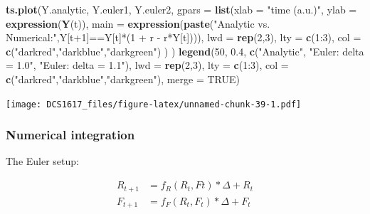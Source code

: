 \documentclass[]{book}
\newenvironment{Shaded}{\begin{snugshade}}{\end{snugshade}}
\newcommand{\KeywordTok}[1]{\textcolor[rgb]{0.13,0.29,0.53}{\textbf{{#1}}}}
\newcommand{\DataTypeTok}[1]{\textcolor[rgb]{0.13,0.29,0.53}{{#1}}}
\newcommand{\DecValTok}[1]{\textcolor[rgb]{0.00,0.00,0.81}{{#1}}}
\newcommand{\FloatTok}[1]{\textcolor[rgb]{0.00,0.00,0.81}{{#1}}}
\newcommand{\StringTok}[1]{\textcolor[rgb]{0.31,0.60,0.02}{{#1}}}
\newcommand{\OtherTok}[1]{\textcolor[rgb]{0.56,0.35,0.01}{{#1}}}
\newcommand{\NormalTok}[1]{{#1}}
\begin{document}
\begin{Shaded}
\begin{Highlighting}[]
\KeywordTok{ts.plot}\NormalTok{(Y.analytic, Y.euler1, Y.euler2,}
        \DataTypeTok{gpars =} \KeywordTok{list}\NormalTok{(}\DataTypeTok{xlab =} \StringTok{"time (a.u.)"}\NormalTok{,}
                     \DataTypeTok{ylab =} \KeywordTok{expression}\NormalTok{(}\KeywordTok{Y}\NormalTok{(t)),}
                     \DataTypeTok{main =} \KeywordTok{expression}\NormalTok{(}\KeywordTok{paste}\NormalTok{(}\StringTok{"Analytic vs. Numerical:"}\NormalTok{,Y[t}\DecValTok{+1}\NormalTok{]==Y[t]*(}\DecValTok{1} \NormalTok{+}\StringTok{ }\NormalTok{r -}\StringTok{ }\NormalTok{r*Y[t]))),}
                     \DataTypeTok{lwd =} \KeywordTok{rep}\NormalTok{(}\DecValTok{2}\NormalTok{,}\DecValTok{3}\NormalTok{),}
                     \DataTypeTok{lty =} \KeywordTok{c}\NormalTok{(}\DecValTok{1}\NormalTok{:}\DecValTok{3}\NormalTok{),}
                     \DataTypeTok{col =} \KeywordTok{c}\NormalTok{(}\StringTok{"darkred"}\NormalTok{,}\StringTok{"darkblue"}\NormalTok{,}\StringTok{"darkgreen"}\NormalTok{)}
                     \NormalTok{)}
        \NormalTok{)}
\KeywordTok{legend}\NormalTok{(}\DecValTok{50}\NormalTok{, }\FloatTok{0.4}\NormalTok{, }\KeywordTok{c}\NormalTok{(}\StringTok{"Analytic"}\NormalTok{,}
                 \StringTok{"Euler: delta = 1.0"}\NormalTok{, }
                 \StringTok{"Euler: delta = 1.1"}\NormalTok{),}
       \DataTypeTok{lwd =} \KeywordTok{rep}\NormalTok{(}\DecValTok{2}\NormalTok{,}\DecValTok{3}\NormalTok{), }\DataTypeTok{lty =} \KeywordTok{c}\NormalTok{(}\DecValTok{1}\NormalTok{:}\DecValTok{3}\NormalTok{), }\DataTypeTok{col =} \KeywordTok{c}\NormalTok{(}\StringTok{"darkred"}\NormalTok{,}\StringTok{"darkblue"}\NormalTok{,}\StringTok{"darkgreen"}\NormalTok{), }\DataTypeTok{merge =} \OtherTok{TRUE}\NormalTok{)}
\end{Highlighting}
\end{Shaded}

\texttt{[image: DCS1617\_files/figure-latex/unnamed-chunk-39-1.pdf]}

\subsubsection*{Numerical integration}\label{numerical-integration-1}

The Euler setup:

\begin{align}
R_{t+1} &= f_R(R_t,Ft) * \Delta + R_t \\
F_{t+1} &= f_F(R_t,F_t) * \Delta + F_t
\end{align}
\end{document}
